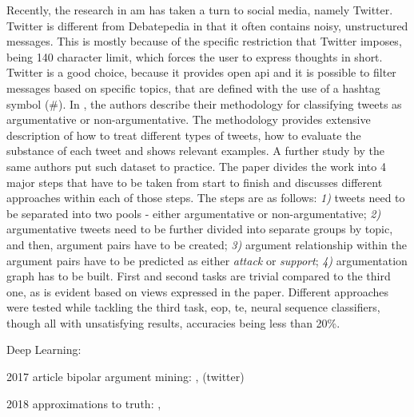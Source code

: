 Recently, the research in \gls{am} has taken a turn to social media, namely Twitter. Twitter is different from Debatepedia in that it often contains noisy, unstructured messages. This is mostly because of the specific restriction that Twitter imposes, being 140 character limit, which forces the user to express thoughts in short. Twitter is a good choice, because it provides open \gls{api} and it is possible to filter messages based on specific topics, that are defined with the use of a hashtag symbol (\#). In \autocite{Bosc2016DARTAD}, the authors describe their methodology for classifying tweets as argumentative or non-argumentative. The methodology provides extensive description of how to treat different types of tweets, how to evaluate the substance of each tweet and shows relevant examples. A further study \autocite{Bosc2016TweetiesSP} by the same authors put such dataset to practice. The paper divides the work into 4 major steps that have to be taken from start to finish and discusses different approaches within each of those steps. The steps are as follows: \textit{1)} tweets need to be separated into two pools - either argumentative or non-argumentative; \textit{2)} argumentative tweets need to be further divided into separate groups by topic, and then, argument pairs have to be created; \textit{3)} argument relationship within the argument pairs have to be predicted as either \textit{attack} or \textit{support}; \textit{4)} argumentation graph has to be built. First and second tasks are trivial compared to the third one, as is evident based on views expressed in the paper. Different approaches were tested while tackling the third task, \gls{eop}, \gls{te}, neural sequence classifiers, though all with unsatisfying results, accuracies being less than 20\%.
 

Deep Learning:
\autocite{Cocarascu2017IdentifyingAA}


2017 article bipolar argument mining:
\autocite{Cocarascu2017MiningBA}, \autocite{Dusmanu2017ArgumentMO} (twitter)

2018 approximations to truth:
\autocite{ApproxToTruth}, \autocite{Cocarascu2016DetectingDR}

